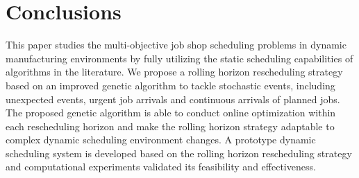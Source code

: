 \section{Conclusions}
This paper studies the multi-objective job shop scheduling problems in dynamic manufacturing environments by fully utilizing the static scheduling capabilities of algorithms in the literature.
We propose a rolling horizon rescheduling strategy based on an improved genetic algorithm to tackle stochastic events, including unexpected events, urgent job arrivals and continuous arrivals of planned jobs.
The proposed genetic algorithm is able to conduct online optimization within each rescheduling horizon and make the rolling horizon strategy adaptable to complex dynamic scheduling environment changes.
A prototype dynamic scheduling system is developed based on the rolling horizon rescheduling strategy and computational experiments validated its feasibility and effectiveness. 